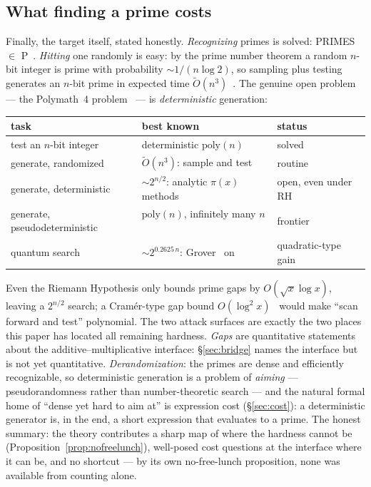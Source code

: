 \documentclass[11pt]{article}
\numberwithin{equation}{section}
\theoremstyle{plain}
\theoremstyle{definition}
\theoremstyle{remark}
\begin{document}
\subsection{What finding a prime costs}\label{sec:costlandscape}

Finally, the target itself, stated honestly. \emph{Recognizing} primes is solved:
PRIMES $\in$ P~\cite{aks}. \emph{Hitting} one randomly is easy: by the prime number
theorem a random $n$-bit integer is prime with probability $\sim 1/(n \log 2)$, so
sampling plus testing generates an $n$-bit prime in expected time
$\widetilde{O}(n^3)$~\cite{crandallpomerance}. The genuine open problem --- the
Polymath~4 problem~\cite{polymath} --- is \emph{deterministic} generation:

\begin{center}\small
\begin{tabular}{@{}lll@{}}
\toprule
task & best known & status \\
\midrule
test an $n$-bit integer & deterministic $\mathrm{poly}(n)$~\cite{aks} & solved \\
generate, randomized & $\widetilde O(n^3)$: sample and test & routine \\
generate, deterministic & $\sim 2^{n/2}$: analytic $\pi(x)$ methods~\cite{polymath} & open, even under RH \\
generate, pseudodeterministic & $\mathrm{poly}(n)$, infinitely many $n$~\cite{chenluors} & frontier \\
quantum search & $\sim 2^{0.2625\,n}$: Grover~\cite{grover} on~\cite{bhp} & quadratic-type gain \\
\bottomrule
\end{tabular}
\end{center}

Even the Riemann Hypothesis only bounds prime gaps by $O(\sqrt{x}\log x)$, leaving a
$2^{n/2}$ search; a Cram\'er-type gap bound $O(\log^2 x)$~\cite{cramer} would make
``scan forward and test'' polynomial. The two attack surfaces are exactly the two
places this paper has located all remaining hardness. \emph{Gaps} are quantitative
statements about the additive--multiplicative interface: \S\ref{sec:bridge} names the
interface but is not yet quantitative. \emph{Derandomization}: the primes are dense
and efficiently recognizable, so deterministic generation is a problem of
\emph{aiming} --- pseudorandomness rather than number-theoretic search --- and the
natural formal home of ``dense yet hard to aim at'' is expression cost
(\S\ref{sec:cost}): a deterministic generator is, in the end, a short expression that
evaluates to a prime. The honest summary: the theory contributes a sharp map of where
the hardness cannot be (Proposition~\ref{prop:nofreelunch}), well-posed cost
questions at the interface where it can be, and no shortcut --- by its own
no-free-lunch proposition, none was available from counting alone.
\end{document}
